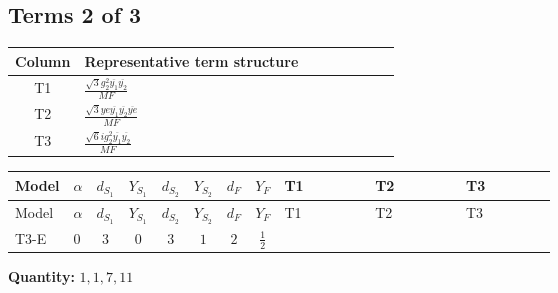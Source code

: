 \documentclass[8pt]{article}
\begin{document}
\begin{landscape}
\subsection*{Terms 2 of 3}
\begin{center}
\begin{tabular}{@{}c >{\raggedright\arraybackslash}p{0.82\linewidth}@{}}
\toprule
Column & Representative term structure \\
\midrule
T1 & \(\displaystyle \frac{\sqrt{3} g_{2}^{2} \overline{y_{1}} \overline{y_{2}}}{MF}\) \\
\midrule
T2 & \(\displaystyle \frac{\sqrt{3} ye \overline{y_{1}} \overline{y_{2}} \overline{ye}}{MF}\) \\
\midrule
T3 & \(\displaystyle \frac{\sqrt{6} i g_{2}^{2} \overline{y_{1}} \overline{y_{2}}}{MF}\) \\
\midrule
\bottomrule
\end{tabular}
\end{center}
\smallskip
\tiny
\begin{longtable}{@{}llcccccc >{\raggedright\arraybackslash}p{0.21\linewidth} >{\raggedright\arraybackslash}p{0.21\linewidth} >{\raggedright\arraybackslash}p{0.21\linewidth}@{}}
\toprule
Model & $\alpha$ & $d_{S_1}$ & $Y_{S_1}$ & $d_{S_2}$ & $Y_{S_2}$ & $d_F$ & $Y_F$ & T1 & T2 & T3 \\
\midrule
\endfirsthead
\toprule
Model & $\alpha$ & $d_{S_1}$ & $Y_{S_1}$ & $d_{S_2}$ & $Y_{S_2}$ & $d_F$ & $Y_F$ & T1 & T2 & T3 \\
\midrule
\endhead
T3-E & $0$ & $3$ & $0$ & $3$ & $1$ & $2$ & $\frac{1}{2}$ & \scriptsize\adjustbox{max width=\linewidth}{$\begin{gathered} \frac{49 \sqrt{3} g_{2}^{2} \overline{y_{1}} \overline{y_{2}}}{24 MF}\end{gathered}$} & \scriptsize\adjustbox{max width=\linewidth}{$\begin{gathered} - \frac{\sqrt{3} ye \overline{y_{1}} \overline{y_{2}} \overline{ye}}{12 MF}\end{gathered}$} & \scriptsize\adjustbox{max width=\linewidth}{$\begin{gathered} \frac{\sqrt{6} i g_{2}^{2} \overline{y_{1}} \overline{y_{2}}}{3 MF}\end{gathered}$} \\
\midrule
\bottomrule
\end{longtable}
\clearpage
\noindent\textbf{Quantity: }$\mathrm{1,1,7,11}$\par\smallskip

\end{landscape}
\end{document}
